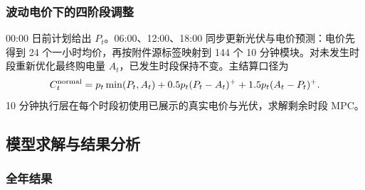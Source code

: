 \documentclass[withoutpreface,bwprint]{cumcmthesis} %
\begin{document}
\subsubsection{波动电价下的四阶段调整}

00:00 日前计划给出 \(P_t\)。06:00、12:00、18:00 同步更新光伏与电价预测：电价先得到 24 个一小时均价，再按附件源标签映射到 144 个 10 分钟模块。对未发生时段重新优化最终购电量 \(A_t\)，已发生时段保持不变。主结算口径为
\begin{equation}
    C_t^{\rm normal}=p_t\min(P_t,A_t)+0.5p_t(P_t-A_t)^++1.5p_t(A_t-P_t)^+.
\end{equation}
10 分钟执行层在每个时段初使用已展示的真实电价与光伏，求解剩余时段 MPC。

\subsection{模型求解与结果分析}

\subsubsection{全年结果}
\end{document}
